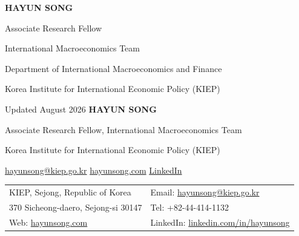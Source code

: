 \iflongcv
  \fontsize{9.5}{11}\selectfont
\fi

\begin{center}
  \iflongcv
    {\LARGE\bfseries HAYUN SONG}\par
    \vspace{4pt}
    {\normalsize Associate Research Fellow}\par
    {\normalsize International Macroeconomics Team}\par
    {\normalsize Department of International Macroeconomics and Finance}\par
    {\normalsize Korea Institute for International Economic Policy (KIEP)}\par
    \vspace{2pt}
    {\small Updated August 2026}
  \else
    {\LARGE\bfseries HAYUN SONG}\par
    \vspace{3pt}
    {\normalsize Associate Research Fellow, International Macroeconomics Team}\par
    {\normalsize Korea Institute for International Economic Policy (KIEP)}\par
    \vspace{3pt}
    {\small
      \href{mailto:hayunsong@kiep.go.kr}{hayunsong@kiep.go.kr}
      \quad\textbar\quad
      \href{https://hayunsong.com}{hayunsong.com}
      \quad\textbar\quad
      \href{https://www.linkedin.com/in/hayunsong}{LinkedIn}
    }
  \fi
\end{center}

\iflongcv
{}
\begin{tabularx}{\linewidth}{@{}X X@{}}
  KIEP, Sejong, Republic of Korea & Email: \href{mailto:hayunsong@kiep.go.kr}{hayunsong@kiep.go.kr} \\
  370 Sicheong-daero, Sejong-si 30147 & Tel: +82-44-414-1132 \\
  Web: \href{https://hayunsong.com}{hayunsong.com} & LinkedIn: \href{https://www.linkedin.com/in/hayunsong}{linkedin.com/in/hayunsong}
\end{tabularx}
\fi

\iflongcv
{}
\else
{}
\fi

